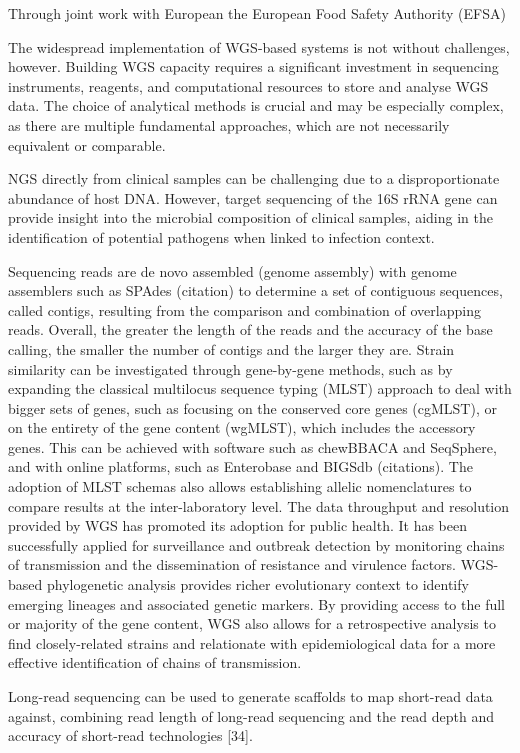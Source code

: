 Through joint work with European the European Food Safety Authority (EFSA)

The widespread implementation of \ac{WGS}-based systems is not without challenges, however. Building \ac{WGS} capacity requires a significant investment in sequencing instruments, reagents, and computational resources to store and analyse \ac{WGS} data. The choice of analytical methods is crucial and may be especially complex, as there are multiple fundamental approaches, which are not necessarily equivalent or comparable.

NGS directly from clinical samples can be challenging due to a disproportionate abundance of host DNA. However, target sequencing of the 16S rRNA gene can provide insight into the microbial composition of clinical samples, aiding in the identification of potential pathogens when linked to infection context.

Sequencing reads are de novo assembled (genome assembly) with genome assemblers such as SPAdes (citation) to determine a set of contiguous sequences, called contigs, resulting from the comparison and combination of overlapping reads. Overall, the greater the length of the reads and the accuracy of the base calling, the smaller the number of contigs and the larger they are.
Strain similarity can be investigated through gene-by-gene methods, such as by expanding the classical multilocus sequence typing (MLST) approach to deal with bigger sets of genes, such as focusing on the conserved core genes (cgMLST), or on the entirety of the gene content (wgMLST), which includes the accessory genes. This can be achieved with software such as chewBBACA and SeqSphere, and with online platforms, such as Enterobase and BIGSdb (citations). The adoption of MLST schemas also allows establishing allelic nomenclatures to compare results at the inter-laboratory level.
The data throughput and resolution provided by WGS has promoted its adoption for public health. It has been successfully applied for surveillance and outbreak detection by monitoring chains of transmission and the dissemination of resistance and virulence factors. WGS-based phylogenetic analysis provides richer evolutionary context to identify emerging lineages and associated genetic markers. By providing access to the full or majority of the gene content, WGS also allows for a retrospective analysis to find closely-related strains and relationate with epidemiological data for a more effective identification of chains of transmission.

Long-read sequencing can be used to generate scaffolds to map short-read data against, combining read length of long-read sequencing and the read depth and accuracy of short-read technologies [34].

